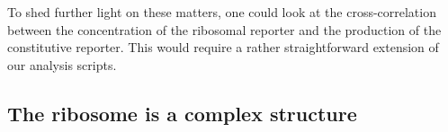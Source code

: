 To shed further light on these matters, one could look at the cross-correlation between
the concentration of the ribosomal reporter and the production of the constitutive reporter.
%
This would require a rather straightforward extension of our analysis scripts.


\subsection{The ribosome is a complex structure}


